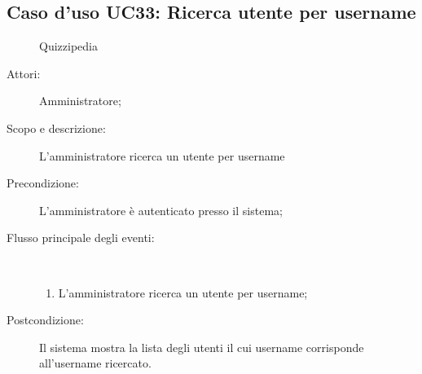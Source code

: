 \subsection{Caso d'uso UC33: Ricerca utente per username}
	\begin{figure}[H]
		\centering
		\begin{resizedtikzpicture}{\textwidth}
		\begin{umlsystem}[x=0, fill=lightgray!20]{Quizzipedia}
		\end{umlsystem}
		\end{resizedtikzpicture}
		\caption{}
	\end{figure}
\begin{description}
\item[Attori:] Amministratore;
\item[Scopo e descrizione:] L'amministratore ricerca un utente per username
      \item[Precondizione:] L'amministratore è autenticato presso il sistema;

        \item[Flusso principale degli eventi:] \ 
 \begin{enumerate}
          \item L'amministratore ricerca un utente per username;

      \end{enumerate}
    \item[Postcondizione:] Il sistema mostra la lista degli utenti il cui username corrisponde all'username ricercato.
  \end{description}
\hypertarget{UC34}{}
